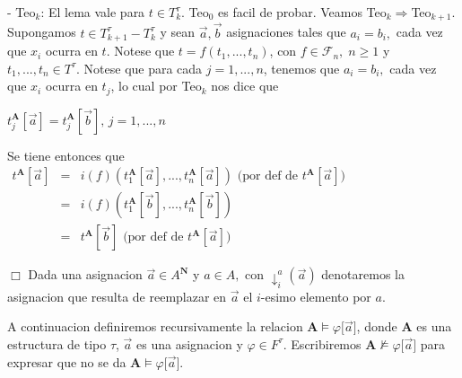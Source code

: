 - Teo\(_{k}\): El lema vale para \(t\in T_{k}^{\tau }\).
Teo\(_{0}\) es facil de probar. Veamos Teo\(_{k}\Rightarrow \)Teo\(_{k+1}\). Supongamos \(t\in T_{k+1}^{\tau }-T_{k}^{\tau }\) y sean \(\vec{a},\vec{b}\) asignaciones tales que \(a_{i}=b_{i},\) cada vez que \(x_{i}\) ocurra en \(t\). Notese que \(t=f(t_{1},...,t_{n})\), con \(f\in \mathcal{F}_{n},\;n\geq 1\) y \( t_{1},...,t_{n}\in T^{\tau }\). Notese que para cada \(j=1,...,n\), tenemos que \(a_{i}=b_{i},\) cada vez que \(x_{i}\) ocurra en \(t_{j}\), lo cual por Teo\(_{k}\) nos dice que

\(\displaystyle t_{j}^{\mathbf{A}}[\vec{a}]=t_{j}^{\mathbf{A}}[\vec{b}]\text{, }j=1,...,n \)

Se tiene entonces que
\(\displaystyle \begin{array}{ccl} t^{\mathbf{A}}[\vec{a}] & = & i(f)(t_{1}^{\mathbf{A}}[\vec{a}],...,t_{n}^{ \mathbf{A}}[\vec{a}])\text{ (por def de }t^{\mathbf{A}}[\vec{a}]\text{)} \\ & = & i(f)(t_{1}^{\mathbf{A}}[\vec{b}],...,t_{n}^{\mathbf{A}}[\vec{b}]) \\ & = & t^{\mathbf{A}}[\vec{b}]\text{ (por def de }t^{\mathbf{A}}[\vec{a}] \text{)} \end{array} \)

\(\Box\)
Dada una asignacion \(\vec{a}\in A^{\mathbf{N}}\) y \(a\in A,\) con \(\downarrow _{i}^{a}(\vec{a})\) denotaremos la asignacion que resulta de reemplazar en \( \vec{a}\) el \(i\)-esimo elemento por \(a\).

A continuacion definiremos recursivamente la relacion \(\mathbf{A}\models \varphi \lbrack \vec{a}]\), donde \(\mathbf{A}\) es una estructura de tipo \( \tau \), \(\vec{a}\) es una asignacion y \(\varphi \in F^{\tau }\). Escribiremos \( \mathbf{A}\not\models \varphi \lbrack \vec{a}]\) para expresar que no se da \( \mathbf{A}\models \varphi \lbrack \vec{a}]\).

